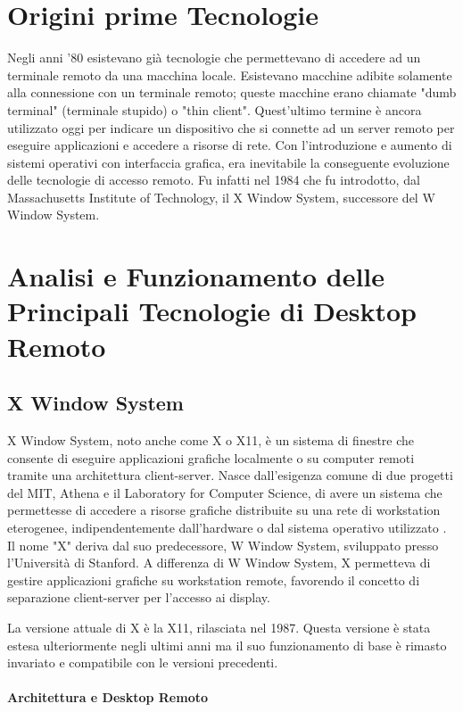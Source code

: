 \documentclass[12pt,a4paper,openright,twoside]{book}
\begin{document}
\section{Origini prime Tecnologie}
Negli anni '80 esistevano già tecnologie che permettevano di accedere ad un terminale remoto da una macchina locale. Esistevano macchine adibite solamente alla connessione con un terminale remoto; queste macchine erano chiamate "dumb terminal" (terminale stupido) o "thin client". Quest'ultimo termine è ancora utilizzato oggi per indicare un dispositivo che si connette ad un server remoto per eseguire applicazioni e accedere a risorse di rete.
Con l'introduzione e aumento di sistemi operativi con interfaccia grafica, era inevitabile la conseguente evoluzione delle tecnologie di accesso remoto. Fu infatti nel 1984 che fu introdotto, dal Massachusetts Institute of Technology, il X Window System, successore del W Window System.

\section{Analisi e Funzionamento delle Principali Tecnologie di Desktop Remoto} 

\subsection{X Window System}
X Window System, noto anche come X o X11, è un sistema di finestre che consente di eseguire applicazioni grafiche localmente o su computer remoti tramite una architettura client-server. 
Nasce dall'esigenza comune di due progetti del MIT, Athena e il Laboratory for Computer Science, di avere un sistema che permettesse di accedere a risorse grafiche distribuite su una rete di workstation eterogenee, indipendentemente dall'hardware o dal sistema operativo utilizzato \cite{scheifler1986x}. 
Il nome "X" deriva dal suo predecessore, W Window System, sviluppato presso l'Università di Stanford. A differenza di W Window System, X permetteva di gestire applicazioni grafiche su workstation remote, favorendo il concetto di separazione client-server per l'accesso ai display.

La versione attuale di X è la X11, rilasciata nel 1987. Questa versione è stata estesa ulteriormente negli ultimi anni ma il suo funzionamento di base è rimasto invariato e compatibile con le versioni precedenti.

\paragraph{Architettura e Desktop Remoto}
\end{document}
